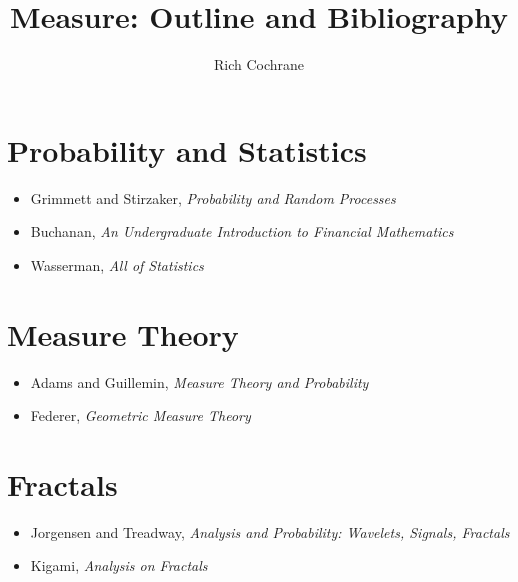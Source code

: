 \documentclass[article]{article}
\begin{document}
	
	\title{Measure: Outline and Bibliography}
	\author{Rich Cochrane}
	\maketitle
	
\section{Probability and Statistics}

\begin{itemize}
	\item{Grimmett and Stirzaker, \textit{Probability and Random Processes}}
	\item{Buchanan, \textit{An Undergraduate Introduction to Financial Mathematics}}
	\item{Wasserman, \textit{All of Statistics}}
\end{itemize}

\section{Measure Theory}

\begin{itemize}
	\item{Adams and Guillemin, \textit{Measure Theory and Probability}}
	\item{Federer, \textit{Geometric Measure Theory}}
\end{itemize}

\section{Fractals}

\begin{itemize}
	\item{Jorgensen and Treadway, \textit{Analysis and Probability: Wavelets, Signals, Fractals}}
	\item{Kigami, \textit{Analysis on Fractals}}
\end{itemize}


	
\end{document}
